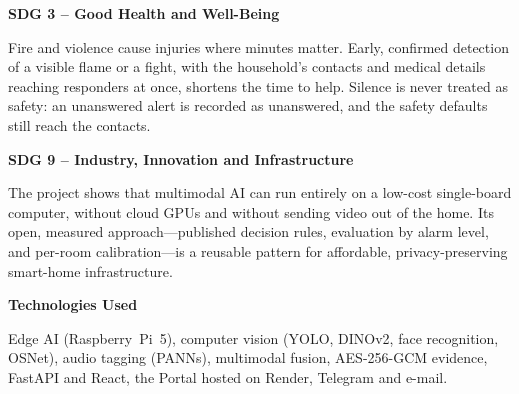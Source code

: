 \textbf{SDG 3 -- Good Health and Well-Being}

Fire and violence cause injuries where minutes matter. Early, confirmed detection of a visible flame or a fight, with the household's contacts and medical details reaching responders at once, shortens the time to help. Silence is never treated as safety: an unanswered alert is recorded as unanswered, and the safety defaults still reach the contacts.

\textbf{SDG 9 -- Industry, Innovation and Infrastructure}

The project shows that multimodal AI can run entirely on a low-cost single-board computer, without cloud GPUs and without sending video out of the home. Its open, measured approach---published decision rules, evaluation by alarm level, and per-room calibration---is a reusable pattern for affordable, privacy-preserving smart-home infrastructure.

\textbf{Technologies Used}

Edge AI (Raspberry~Pi~5), computer vision (YOLO, DINOv2, face recognition, OSNet), audio tagging (PANNs), multimodal fusion, AES-256-GCM evidence, FastAPI and React, the Portal hosted on Render, Telegram and e-mail.
\endgroup
